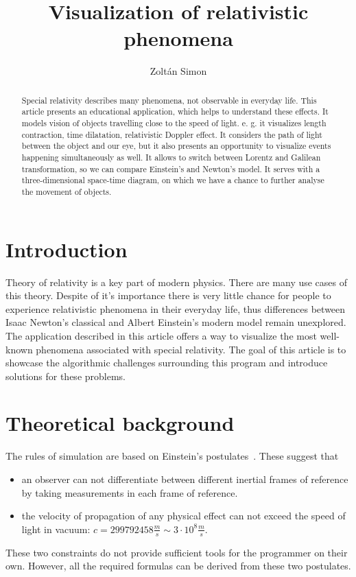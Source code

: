 \documentclass{egpubl}
\title[Visualization of relativity]{Visualization of relativistic phenomena}
\author{Zoltán Simon}
\begin{document}
\maketitle

\begin{abstract}
Special relativity describes many phenomena, not observable in everyday life. This article presents an educational application, which helps to understand these effects. It models vision of objects travelling close to the speed of light. e. g. it visualizes length contraction, time dilatation, relativistic Doppler effect. It considers the path of light between the object and our eye, but it also presents an opportunity to visualize events happening simultaneously as well. It allows to switch between Lorentz and Galilean transformation, so we can compare Einstein's and Newton's model. It serves with a three-dimensional space-time diagram, on which we have a chance to further analyse the movement of objects.
\end{abstract}

\section{Introduction}
\label{sec:introduction}
Theory of relativity is a key part of modern physics. There are many use cases of this theory. Despite of it's importance there is very little chance for people to experience relativistic phenomena in their everyday life, thus differences between Isaac Newton's classical and Albert Einstein's modern model remain unexplored. The application described in this article offers a way to visualize the most well-known phenomena associated with special relativity. The goal of this article is to showcase the algorithmic challenges surrounding this program and introduce solutions for these problems.

\section{Theoretical background}
\label{sec:theoretical_background}
The rules of simulation are based on Einstein's postulates~\cite{EinsteinElectrodynamics}. These suggest that
\begin{itemize}
\item an observer can not differentiate between different inertial frames of reference by taking measurements in each frame of reference.
\item the velocity of propagation of any physical effect can not exceed
the speed of light in vacuum: $c=299792458 \frac{m}{s} \sim 3 \cdot 10^8 \frac{m}{s}$.
 \end{itemize}
These two constraints do not provide sufficient tools for the programmer on their own. However, all the required formulas can be derived from these two postulates.
\end{document}
